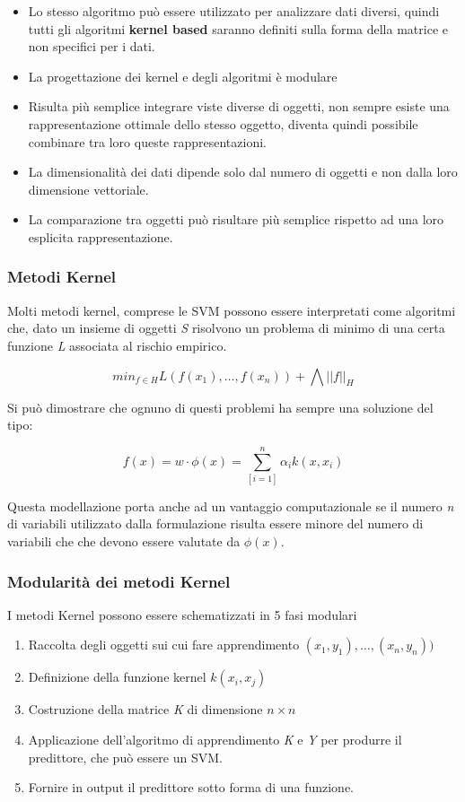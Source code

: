 \begin{itemize}
\tightlist
\item
  Lo stesso algoritmo può essere utilizzato per analizzare dati diversi,
  quindi tutti gli algoritmi \textbf{kernel based} saranno definiti
  sulla forma della matrice e non specifici per i dati.
\item
  La progettazione dei kernel e degli algoritmi è modulare
\item
  Risulta più semplice integrare viste diverse di oggetti, non sempre
  esiste una rappresentazione ottimale dello stesso oggetto, diventa
  quindi possibile combinare tra loro queste rappresentazioni.
\item
  La dimensionalità dei dati dipende solo dal numero di oggetti e non
  dalla loro dimensione vettoriale.
\item
  La comparazione tra oggetti può risultare più semplice rispetto ad una
  loro esplicita rappresentazione.
\end{itemize}

\subsubsection{Metodi Kernel}\label{metodi-kernel}

Molti metodi kernel, comprese le SVM possono essere interpretati come
algoritmi che, dato un insieme di oggetti \emph{S} risolvono un problema
di minimo di una certa funzione \emph{L} associata al rischio empirico.

$$ min_{f \in H} L(f(x_1),\ldots, f(x_n)) + \bigwedge ||f||_H$$

Si può dimostrare che ognuno di questi problemi ha sempre una soluzione del tipo:

$$ f(x) = w \cdot \phi(x) = \sum\limits_[i=1]^n \alpha_i k(x,x_i)$$

Questa modellazione porta anche ad un vantaggio computazionale se il numero \textit{n} di variabili utilizzato dalla formulazione risulta essere minore del numero di variabili che che devono essere valutate da $\phi(x)$.

\subsubsection{Modularità dei metodi Kernel}\label{modularituxe0-dei-metodi-kernel}

I metodi Kernel possono essere schematizzati in 5 fasi modulari

\begin{enumerate}
\item
  Raccolta degli oggetti sui cui fare apprendimento $(x_1,y_1), \ldots, (x_n, y_n))$
\item
  Definizione della funzione kernel $k(x_i,x_j)$
\item
  Costruzione della matrice \emph{K} di dimensione $n \times n$
\item
  Applicazione dell'algoritmo di apprendimento \emph{K} e \emph{Y} per produrre il predittore, che può essere un SVM.
\item
  Fornire in output il predittore sotto forma di una funzione.
\end{enumerate}

